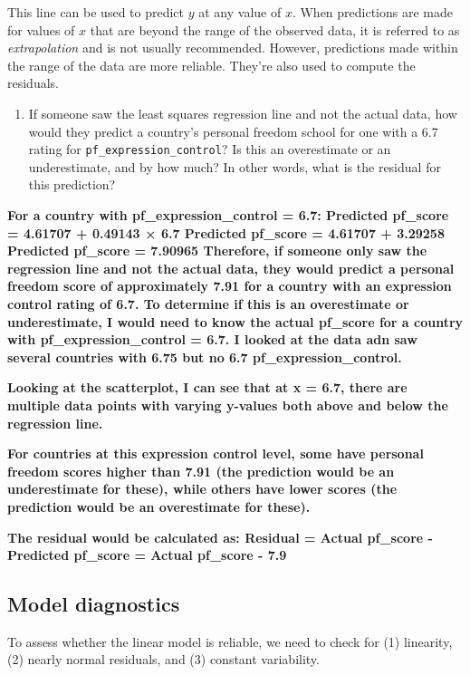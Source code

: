 \documentclass[
]{article}
\providecommand{\tightlist}{%
  \setlength{\itemsep}{0pt}\setlength{\parskip}{0pt}}
\begin{document}
This line can be used to predict \(y\) at any value of \(x\). When
predictions are made for values of \(x\) that are beyond the range of
the observed data, it is referred to as \emph{extrapolation} and is not
usually recommended. However, predictions made within the range of the
data are more reliable. They're also used to compute the residuals.

\begin{enumerate}
\def\labelenumi{\arabic{enumi}.}
\setcounter{enumi}{5}
\tightlist
\item
  If someone saw the least squares regression line and not the actual
  data, how would they predict a country's personal freedom school for
  one with a 6.7 rating for \texttt{pf\_expression\_control}? Is this an
  overestimate or an underestimate, and by how much? In other words,
  what is the residual for this prediction?
\end{enumerate}

\textbf{For a country with pf\_expression\_control = 6.7: Predicted
pf\_score = 4.61707 + 0.49143 × 6.7 Predicted pf\_score = 4.61707 +
3.29258 Predicted pf\_score = 7.90965 Therefore, if someone only saw the
regression line and not the actual data, they would predict a personal
freedom score of approximately 7.91 for a country with an expression
control rating of 6.7. To determine if this is an overestimate or
underestimate, I would need to know the actual pf\_score for a country
with pf\_expression\_control = 6.7. I looked at the data adn saw several
countries with 6.75 but no 6.7 pf\_expression\_control.}

\textbf{Looking at the scatterplot, I can see that at x = 6.7, there are
multiple data points with varying y-values both above and below the
regression line.}

\textbf{For countries at this expression control level, some have
personal freedom scores higher than 7.91 (the prediction would be an
underestimate for these), while others have lower scores (the prediction
would be an overestimate for these).}

\textbf{The residual would be calculated as: Residual = Actual pf\_score
- Predicted pf\_score = Actual pf\_score - 7.9}

\subsection{Model diagnostics}\label{model-diagnostics}

To assess whether the linear model is reliable, we need to check for (1)
linearity, (2) nearly normal residuals, and (3) constant variability.
\end{document}

